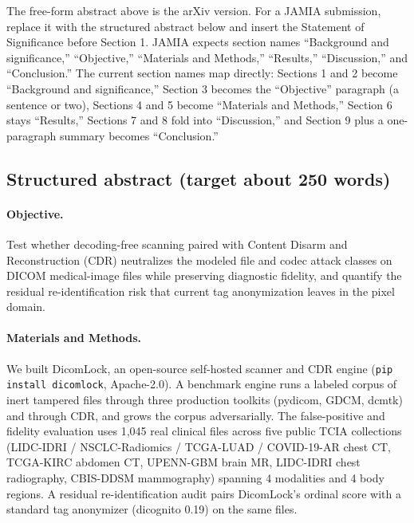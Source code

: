 \documentclass[11pt]{article}
\begin{document}
The free-form abstract above is the arXiv version. For a JAMIA submission, replace it with the structured abstract below and insert the Statement of Significance before Section 1. JAMIA expects section names ``Background and significance,'' ``Objective,'' ``Materials and Methods,'' ``Results,'' ``Discussion,'' and ``Conclusion.'' The current section names map directly: Sections 1 and 2 become ``Background and significance,'' Section 3 becomes the ``Objective'' paragraph (a sentence or two), Sections 4 and 5 become ``Materials and Methods,'' Section 6 stays ``Results,'' Sections 7 and 8 fold into ``Discussion,'' and Section 9 plus a one-paragraph summary becomes ``Conclusion.''

\subsection{Structured abstract (target about 250 words)}

\paragraph{Objective.} Test whether decoding-free scanning paired with Content Disarm and Reconstruction (CDR) neutralizes the modeled file and codec attack classes on DICOM medical-image files while preserving diagnostic fidelity, and quantify the residual re-identification risk that current tag anonymization leaves in the pixel domain.

\paragraph{Materials and Methods.} We built DicomLock, an open-source self-hosted scanner and CDR engine (\texttt{pip install dicomlock}, Apache-2.0). A benchmark engine runs a labeled corpus of inert tampered files through three production toolkits (pydicom, GDCM, dcmtk) and through CDR, and grows the corpus adversarially. The false-positive and fidelity evaluation uses 1,045 real clinical files across five public TCIA collections (LIDC-IDRI / NSCLC-Radiomics / TCGA-LUAD / COVID-19-AR chest CT, TCGA-KIRC abdomen CT, UPENN-GBM brain MR, LIDC-IDRI chest radiography, CBIS-DDSM mammography) spanning 4 modalities and 4 body regions. A residual re-identification audit pairs DicomLock's ordinal score with a standard tag anonymizer (dicognito 0.19) on the same files.
\end{document}
